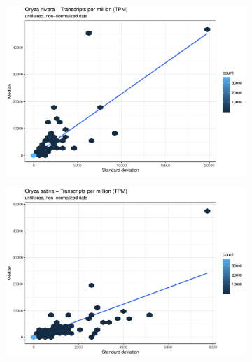 \begin{figure}[htbp]
    \caption{TPM statistics about the imported kallisto data}
    \label{fig:2.1-TPM-Stats}
    \begin{subfigure}[t]{0.48\linewidth}
        \caption{}
        \label{fig:2.1-TPM-Stats-Oryza_nivara}
        \includegraphics[width=\textwidth]{../../results/plots-and-tables/2.1-TPM-Stats-Oryza_nivara}
    \end{subfigure}
    \begin{subfigure}[t]{0.48\linewidth}
        \caption{}
        \label{fig:2.1-TPM-Stats-Oryza_sativa}
        \includegraphics[width=\textwidth]{../../results/plots-and-tables/2.1-TPM-Stats-Oryza_sativa}
    \end{subfigure}
\end{figure}

